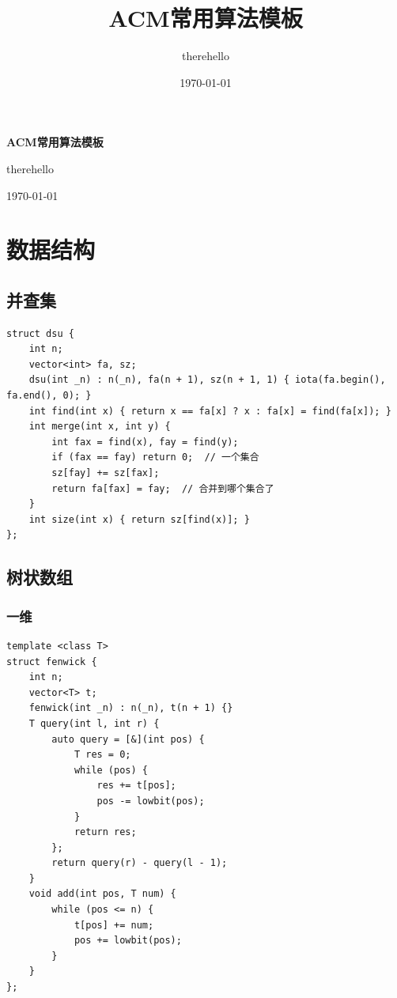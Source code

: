 \documentclass[UTF8, twoside]{ctexart}
\title{ACM常用算法模板}
\author{therehello}
\date{\today}
\newcommand\blankpage{
    \null
    \thispagestyle{empty}
    \addtocounter{page}{-1}
    \newpage
}
\begin{document}
\begin{sloppypar}

\begin{titlepage}
    \centering
    {\fontsize{40pt}{0pt}\selectfont \textbf{ACM常用算法模板}\par} %
    \vfill %
    {\fontsize{12pt}{0pt}\selectfont therehello\par} %
    \today %
\end{titlepage}

\blankpage

\tableofcontents

\clearpage

\section{数据结构}

\subsection{并查集}

\begin{lstlisting}[style=cpp]
struct dsu {
    int n;
    vector<int> fa, sz;
    dsu(int _n) : n(_n), fa(n + 1), sz(n + 1, 1) { iota(fa.begin(), fa.end(), 0); }
    int find(int x) { return x == fa[x] ? x : fa[x] = find(fa[x]); }
    int merge(int x, int y) {
        int fax = find(x), fay = find(y);
        if (fax == fay) return 0;  // 一个集合
        sz[fay] += sz[fax];
        return fa[fax] = fay;  // 合并到哪个集合了
    }
    int size(int x) { return sz[find(x)]; }
};
\end{lstlisting}

\subsection{树状数组}

\subsubsection{一维}

\begin{lstlisting}[style=cpp]
template <class T>
struct fenwick {
    int n;
    vector<T> t;
    fenwick(int _n) : n(_n), t(n + 1) {}
    T query(int l, int r) {
        auto query = [&](int pos) {
            T res = 0;
            while (pos) {
                res += t[pos];
                pos -= lowbit(pos);
            }
            return res;
        };
        return query(r) - query(l - 1);
    }
    void add(int pos, T num) {
        while (pos <= n) {
            t[pos] += num;
            pos += lowbit(pos);
        }
    }
};
\end{lstlisting}


\end{sloppypar}
\end{document}

